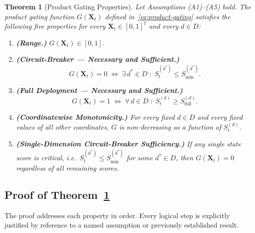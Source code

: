 \documentclass[12pt,openany]{book}
\numberwithin{equation}{chapter}
\theoremstyle{plain}
\newtheorem{theorem}{Theorem}[chapter]
\theoremstyle{definition}
\theoremstyle{remark}
\def\mathcal#1{#1}%
\begin{document}
\begin{theorem}[Product Gating Properties]
\label{thm:product-gating}
Let Assumptions \emph{(A1)--(A5)} hold.
The product gating function $G(\mathbf{X}_t)$ defined
in~\eqref{eq:product-gating} satisfies the following five
properties for every
$\mathbf{X}_t \in [0,1]^{7}$
and every $d \in \mathcal{D}$:
\begin{enumerate}
  \item \textbf{(Range.)}
        $G(\mathbf{X}_t) \in [0,1]$.
  \item \textbf{(Circuit-Breaker --- Necessary and Sufficient.)}
        \begin{equation}
          G(\mathbf{X}_t) = 0
          \;\Longleftrightarrow\;
          \exists\, d^* \in \mathcal{D}
          \;:\;
          \mathcal{S}_t^{(d^*)} \leq \mathcal{S}_{\min}^{(d^*)}.
          \label{eq:G-zero-iff}
        \end{equation}
  \item \textbf{(Full Deployment --- Necessary and Sufficient.)}
        \begin{equation}
          G(\mathbf{X}_t) = 1
          \;\Longleftrightarrow\;
          \forall\, d \in \mathcal{D}
          \;:\;
          \mathcal{S}_t^{(d)}
            \geq \mathcal{S}_{\mathrm{full}}^{(d)}.
          \label{eq:G-one-iff}
        \end{equation}
  \item \textbf{(Coordinatewise Monotonicity.)}
        For every fixed $d \in \mathcal{D}$ and every fixed
        values of all other coordinates, $G$ is non-decreasing
        as a function of $\mathcal{S}_t^{(d)}$.
  \item \textbf{(Single-Dimension Circuit-Breaker Sufficiency.)}
        If any single state score is critical, i.e.\
        $\mathcal{S}_t^{(d^*)} \leq \mathcal{S}_{\min}^{(d^*)}$
        for some $d^* \in \mathcal{D}$, then $G(\mathbf{X}_t) = 0$
        regardless of all remaining scores.
\end{enumerate}
\end{theorem}

\subsection{Proof of Theorem~\ref{thm:product-gating}}

The proof addresses each property in order.  Every logical
step is explicitly justified by reference to a named
assumption or previously established result.
\end{document}
